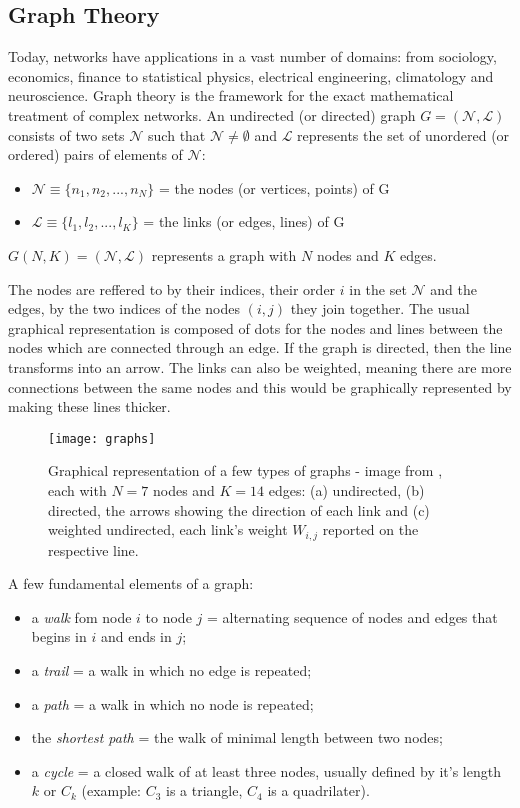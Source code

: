 \subsection{Graph Theory} 
Today, networks have applications in a vast number of domains: from sociology, economics, finance to statistical physics, electrical engineering, climatology and neuroscience. Graph theory is the framework for the exact mathematical treatment of complex networks. An undirected (or directed) graph $G=(\mathcal{N},\mathcal{L})$ consists of two sets $\mathcal{N}$ such that $\mathcal{N} \neq \emptyset$ and $\mathcal{L}$ represents the set of unordered (or ordered) pairs of elements of $\mathcal{N}$:
\begin{itemize}
	\item $\mathcal{N} \equiv \{ n_1,n_2,...,n_N \}$ = the nodes (or vertices, points) of G
	\item $\mathcal{L} \equiv \{ l_1,l_2,...,l_K \}$ = the links (or edges, lines) of G 
\end{itemize}
$G(N,K) = (\mathcal{N},\mathcal{L})$ represents a graph with $N$ nodes and $K$ edges.\par 
The nodes are reffered to by their indices, their order $i$ in the set $\mathcal{N}$ and the edges, by the two indices of the nodes $(i,j)$ they join together. The usual graphical representation is composed of dots for the nodes and lines between the nodes which are connected through an edge. If the graph is directed, then the line transforms into an arrow. The links can also be weighted, meaning there are more connections between the same nodes and this would be graphically represented by making these lines thicker.

\begin{figure}[!h]
  \centering
  \texttt{[image: graphs]}
  \caption{Graphical representation of a few types of graphs - image from \cite{latora}, each with $N=7$ nodes and $K=14$ edges: (a) undirected, (b) directed, the arrows showing the direction of each link and (c) weighted undirected, each link's weight $W_{i,j}$ reported on the respective line.}
  \label{fig:graphs}
\end{figure}

A few fundamental elements of a graph:
\begin{itemize}
	\item a {\it walk} fom node $i$ to node $j$ = alternating sequence of nodes and edges that begins in $i$ and ends in $j$;
	\item a {\it trail} = a walk in which no edge is repeated;
	\item a {\it path} = a walk in which no node is repeated;
	\item the {\it shortest path} = the walk of minimal length between two nodes;
	\item a {\it cycle} = a closed walk of at least three nodes, usually defined by it's length $k$ or $C_k$ (example: $C_3$ is a triangle, $C_4$ is a quadrilater).
\end{itemize}


